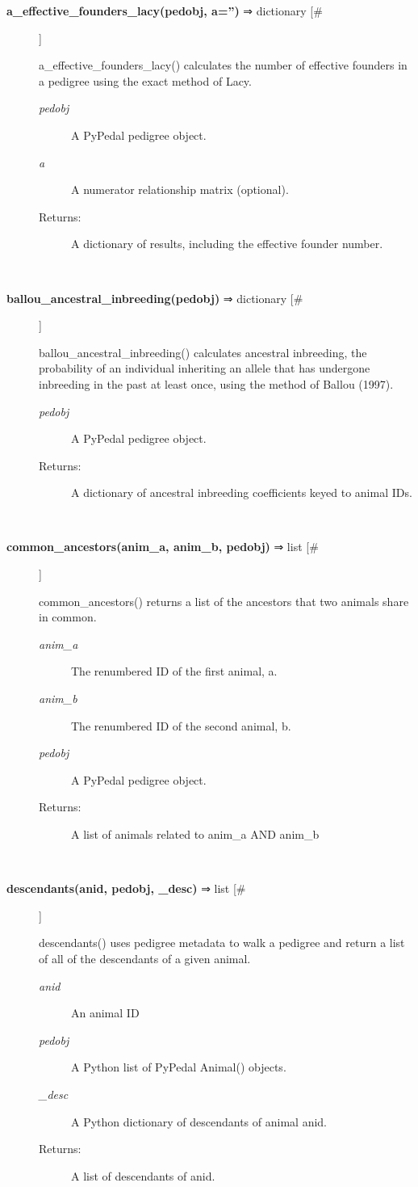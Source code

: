 \documentclass{article}
\begin{document}
\begin{description}
\item[\textbf{a\_effective\_founders\_lacy(pedobj, a='')} ⇒ dictionary [\#]
]
\par a\_effective\_founders\_lacy() calculates the number of effective founders in a
pedigree using the exact method of Lacy.
\begin{description}
\item[\textit{pedobj}
]
A PyPedal pedigree object.
\item[\textit{a}
]
A numerator relationship matrix (optional).
\item[Returns:
]
A dictionary of results, including the effective founder number.
\end{description}\\

\item[\textbf{ballou\_ancestral\_inbreeding(pedobj)} ⇒ dictionary [\#]
]
\par ballou\_ancestral\_inbreeding() calculates ancestral inbreeding,
the probability of an individual inheriting an allele that has
undergone inbreeding in the past at least once, using the method
of Ballou (1997).
\begin{description}
\item[\textit{pedobj}
]
A PyPedal pedigree object.
\item[Returns:
]
A dictionary of ancestral inbreeding coefficients keyed to animal IDs.
\end{description}\\

\item[\textbf{common\_ancestors(anim\_a, anim\_b, pedobj)} ⇒ list [\#]
]
\par common\_ancestors() returns a list of the ancestors that two animals share in common.
\begin{description}
\item[\textit{anim\_a}
]
The renumbered ID of the first animal, a.
\item[\textit{anim\_b}
]
The renumbered ID of the second animal, b.
\item[\textit{pedobj}
]
A PyPedal pedigree object.
\item[Returns:
]
A list of animals related to anim\_a AND anim\_b
\end{description}\\

\item[\textbf{descendants(anid, pedobj, \_desc)} ⇒ list [\#]
]
\par descendants() uses pedigree metadata to walk a pedigree and return a list of all
of the descendants of a given animal.
\begin{description}
\item[\textit{anid}
]
An animal ID
\item[\textit{pedobj}
]
A Python list of  PyPedal Animal() objects.
\item[\textit{\_desc}
]
A Python dictionary of descendants of animal anid.
\item[Returns:
]
A list of descendants of anid.
\end{description}\\


\end{description}
\end{document}
